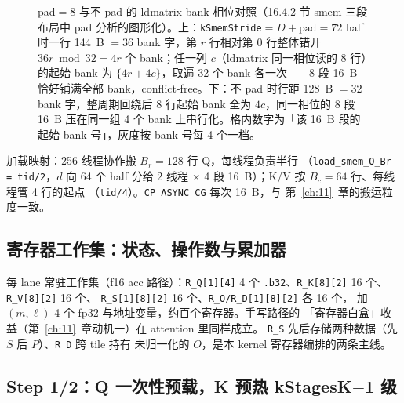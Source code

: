 \begin{figure}[H]
\caption{pad$=$8 与不 pad 的 ldmatrix bank 相位对照（16.4.2 节 smem 三段布局中 pad 分析的图形化）。上：\texttt{kSmemStride}$=D{+}\mathrm{pad}=72$ half 时一行 144~B $=36$ bank 字，第 $r$ 行相对第 0 行整体错开 $36r \bmod 32 = 4r$ 个 bank；任一列 $c$（ldmatrix 同一相位读的 8 行）的起始 bank 为 $\{4r{+}4c\}$，取遍 32 个 bank 各一次——8 段 16~B 恰好铺满全部 bank，conflict-free。下：不 pad 时行距 128~B $=32$ bank 字，整周期回绕后 8 行起始 bank 全为 $4c$，同一相位的 8 段 16~B 压在同一组 4 个 bank 上串行化。格内数字为「该 16~B 段的起始 bank 号」，灰度按 bank 号每 4 个一档。}
\label{fig:16-bank-phase}
\end{figure}

加载映射：256 线程协作搬 $B_r{=}128$ 行 Q，每线程负责半行
（\texttt{load\_\allowbreak{}smem\_\allowbreak{}Q\_\allowbreak{}Br =\allowbreak{} tid/\allowbreak{}2}，$d$ 向 64 个 half 分给 2 线程
$\times$ 4 段 16~B）；K/V 按 $B_c{=}64$ 行、每线程管 4 行的起点
（\texttt{tid/4}）。\texttt{CP\_ASYNC\_CG} 每次 16~B，与
第~\ref{ch:11}~章的搬运粒度一致。

\subsection{寄存器工作集：状态、操作数与累加器}



每 lane 常驻工作集（f16 acc 路径）：\texttt{R\_Q[1][4]} 4 个
\texttt{.b32}、\texttt{R\_K[8][2]} 16 个、\texttt{R\_V[8][2]} 16 个、
\texttt{R\_\allowbreak{}S[1][8][2]} 16 个、\texttt{R\_\allowbreak{}O/\allowbreak{}R\_\allowbreak{}D[1][8][2]} 各 16 个，
加 $(m,\ell)$ 4 个 fp32 与地址变量，约百个寄存器。手写路径的
「寄存器白盒」收益（第~\ref{ch:11}~章动机一）在 attention 里同样成立。
\texttt{R\_S} 先后存储两种数据（先 $S$ 后 $P$）、\texttt{R\_D} 跨 tile 持有
未归一化的 $O$，是本 kernel 寄存器编排的两条主线。

\subsection{Step 1/2：Q 一次性预载，K 预热 kStagesK$-$1 级}

